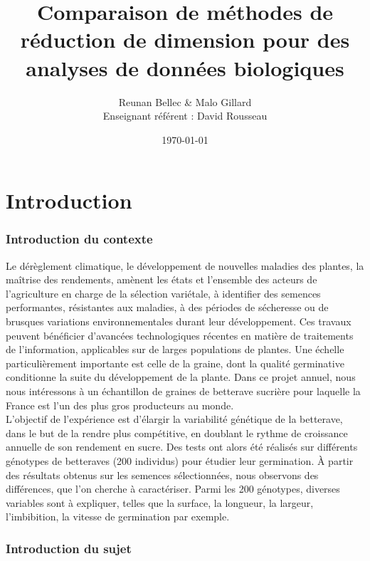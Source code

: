 \documentclass[12pt]{report}
\title{\textbf{Comparaison de méthodes de réduction de dimension pour des analyses de données biologiques}}
\author{Reunan Bellec \& Malo Gillard \\ Enseignant référent : David Rousseau}
\date{\today} %
\begin{document}
\maketitle

\newpage

\tableofcontents

\newpage
\part{Introduction}

\section*{Introduction du contexte}

Le dérèglement climatique, le développement de nouvelles maladies des plantes, la maîtrise des rendements, amènent les états et l’ensemble des acteurs de l’agriculture en charge de la sélection variétale, à identifier des semences performantes, résistantes aux maladies, à des périodes de sécheresse ou de brusques variations environnementales durant leur développement. Ces travaux peuvent bénéficier d’avancées technologiques récentes en matière de traitements de l’information, applicables sur de larges populations de plantes. Une échelle particulièrement importante est celle de la graine, dont la qualité germinative conditionne la suite du développement de la plante. Dans ce projet annuel, nous nous intéressons à un échantillon de graines de betterave sucrière pour laquelle la France est l’un des plus gros producteurs au monde.\\

L'objectif de l'expérience est d'élargir la variabilité génétique de la betterave, dans le but de la rendre plus compétitive, en doublant le rythme de croissance annuelle de son rendement en sucre.
Des tests ont alors été réalisés sur différents génotypes de betteraves (200 individus) pour étudier leur germination.
À partir des résultats obtenus sur les semences sélectionnées, nous observons des différences, que l'on cherche à caractériser. Parmi les 200 génotypes, diverses variables sont à expliquer, telles que la surface, la longueur, la largeur, l'imbibition, la vitesse de germination par exemple.\\

\section*{Introduction du sujet}
\end{document}
